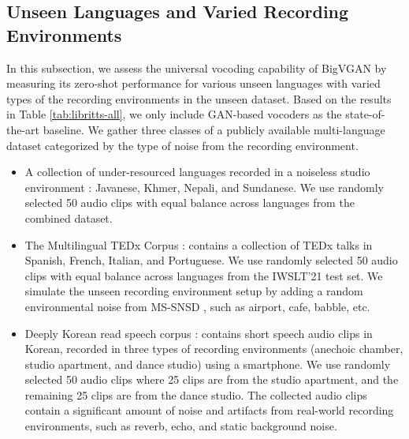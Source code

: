 \documentclass{article} \usepackage{iclr2023_conference,times}
\theoremstyle{plain}
\theoremstyle{definition}
\theoremstyle{remark}
\begin{document}
\subsection{Unseen Languages and Varied Recording Environments}
\vspace{-.1cm}
In this subsection, we assess the universal vocoding capability of BigVGAN by measuring its zero-shot performance for various unseen languages with varied types of the recording environments in the unseen dataset.
Based on the results in Table \ref{tab:libritts-all}, we only include GAN-based vocoders as the state-of-the-art baseline.
We gather three classes of a publicly available multi-language dataset categorized by the type of noise from the recording environment.
\begin{itemize} [leftmargin=2.2em]
\vspace{-1em}
\item A collection of under-resourced languages recorded in a noiseless studio environment \citep{sodimana2018step}: Javanese, Khmer, Nepali, and Sundanese. We use randomly selected 50 audio clips with equal balance across languages from the combined dataset.
\vspace{-.3em}
\item The Multilingual TEDx Corpus \citep{salesky2021multilingual}: contains a collection of TEDx talks in Spanish, French, Italian, and Portuguese. We use randomly selected 50 audio clips with equal balance across languages from the IWSLT'21 test set. We simulate the unseen recording environment setup by adding a random environmental noise from MS-SNSD \citep{reddy2019scalable}, such as airport, cafe, babble, etc.
\vspace{-.3em}
\item Deeply Korean read speech corpus \citep{deeply_corpus_kor}: contains short speech audio clips in Korean, recorded in three types of recording environments (anechoic chamber, studio apartment, and dance studio) using a smartphone. 
We use randomly selected 50 audio clips where 25 clips are from the studio apartment, and the remaining 25 clips are from the dance studio. The collected audio clips contain a significant amount of noise and artifacts from real-world recording environments, such as reverb, echo, and static background noise.
\vspace{-.5em}
\end{itemize}
\end{document}
